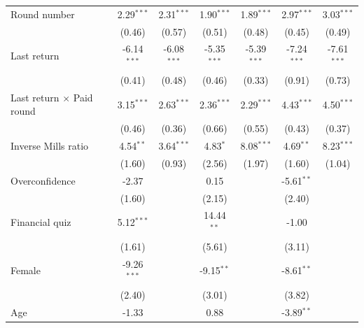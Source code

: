 \begin{tabular}{lcccccc}
   Round number                         & 2.29$^{***}$  & 2.31$^{***}$  & 1.90$^{***}$  & 1.89$^{***}$  & 2.97$^{***}$  & 3.03$^{***}$\\   
                                        & (0.46)        & (0.57)        & (0.51)        & (0.48)        & (0.45)        & (0.49)\\   
   Last return                          & -6.14$^{***}$ & -6.08$^{***}$ & -5.35$^{***}$ & -5.39$^{***}$ & -7.24$^{***}$ & -7.61$^{***}$\\   
                                        & (0.41)        & (0.48)        & (0.46)        & (0.33)        & (0.91)        & (0.73)\\   
   Last return $\times$ Paid round      & 3.15$^{***}$  & 2.63$^{***}$  & 2.36$^{***}$  & 2.29$^{***}$  & 4.43$^{***}$  & 4.50$^{***}$\\   
                                        & (0.46)        & (0.36)        & (0.66)        & (0.55)        & (0.43)        & (0.37)\\   
   Inverse Mills ratio                  & 4.54$^{**}$   & 3.64$^{***}$  & 4.83$^{*}$    & 8.08$^{***}$  & 4.69$^{**}$   & 8.23$^{***}$\\   
                                        & (1.60)        & (0.93)        & (2.56)        & (1.97)        & (1.60)        & (1.04)\\   
   Overconfidence                       & -2.37         &               & 0.15          &               & -5.61$^{**}$  &   \\   
                                        & (1.60)        &               & (2.15)        &               & (2.40)        &   \\   
   Financial quiz                       & 5.12$^{***}$  &               & 14.44$^{**}$  &               & -1.00         &   \\   
                                        & (1.61)        &               & (5.61)        &               & (3.11)        &   \\   
   Female                               & -9.26$^{***}$ &               & -9.15$^{**}$  &               & -8.61$^{**}$  &   \\   
                                        & (2.40)        &               & (3.01)        &               & (3.82)        &   \\   
   Age                                  & -1.33         &               & 0.88          &               & -3.89$^{**}$  &   \\   

\end{tabular}
